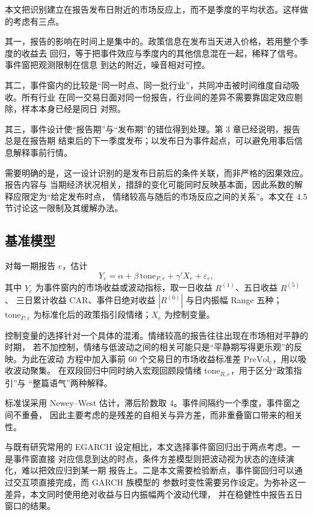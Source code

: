 本文把识别建立在报告发布日附近的市场反应上，而不是季度的平均状态。这样做的考虑有三点。

其一，报告的影响在时间上是集中的。政策信息在发布当天进入价格，若用整个季度的收益去
回归，等于把事件效应与季度内的其他信息混在一起，稀释了信号。事件窗把观测限制在信息
到达的附近，噪音相对可控。

其二，事件窗内的比较是“同一时点、同一批行业”，共同冲击被时间维度自动吸收。所有行业
在同一交易日面对同一份报告，行业间的差异不需要靠固定效应剔除，样本本身已经是同日
对照。

其三，事件设计使“报告期”与“发布期”的错位得到处理。第 3 章已经说明，报告总是在报告期
结束后的下一季度发布；以发布日为事件起点，可以避免用事后信息解释事前行情。

需要明确的是，这一设计识别的是发布日前后的条件关联，而非严格的因果效应。报告内容与
当期经济状况相关，措辞的变化可能同时反映基本面，因此系数的解释应限定为“给定发布时点，
情绪较高与随后的市场反应之间的关系”。本文在 4.5 节讨论这一限制及其缓解办法。

\subsection{基准模型}

对每一期报告 $e$，估计
\begin{equation}
Y_e=\alpha+\beta\,\text{tone}_{P,e}+\gamma'X_e+\varepsilon_e,
\label{eq:baseline}
\end{equation}
其中 $Y_e$ 为事件窗内的市场收益或波动指标，取一日收益 $R^{(1)}$、五日收益 $R^{(5)}$、
三日累计收益 CAR、事件日绝对收益 $|R^{(0)}|$ 与日内振幅 Range 五种；
$\text{tone}_{P,e}$ 为标准化后的政策指引段情绪；$X_e$ 为控制变量。

控制变量的选择针对一个具体的混淆。情绪较高的报告往往出现在市场相对平静的时期，
若不加控制，情绪与低波动之间的相关可能只是“平静期写得更乐观”的反映。为此在波动
方程中加入事前 60 个交易日的市场收益标准差 $\text{PreVol}_e$，用以吸收波动聚集。
在双段回归中同时纳入宏观回顾段情绪 $\text{tone}_{R,e}$，用于区分“政策指引”与
“整篇语气”两种解释。

标准误采用 Newey--West 估计，滞后阶数取 4。事件间隔约一个季度，事件窗之间不重叠，
因此主要考虑的是残差的自相关与异方差，而非重叠窗口带来的相关性。

与既有研究常用的 EGARCH 设定相比，本文选择事件窗回归出于两点考虑。一是事件窗直接
对应信息到达的时点，条件方差模型则把波动视为状态的连续演化，难以把效应归到某一期
报告上。二是本文需要检验断点，事件窗回归可以通过交互项直接完成，而 GARCH 族模型的
参数时变性需要另作设定。为弥补这一差异，本文同时使用绝对收益与日内振幅两个波动代理，
并在稳健性中报告五日窗口的结果。

